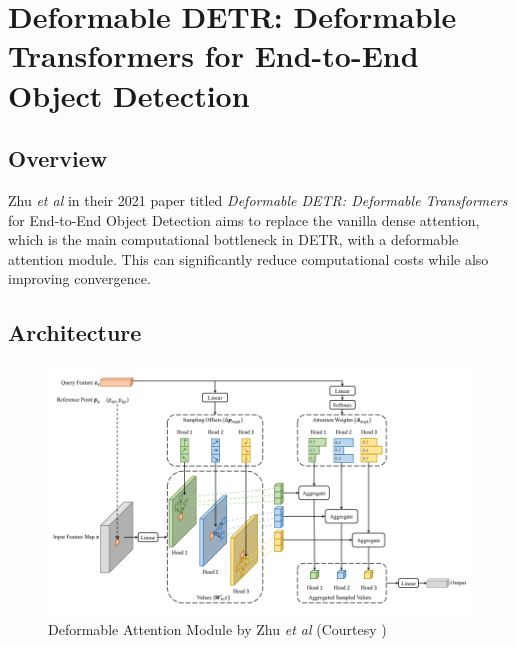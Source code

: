 \section{Deformable DETR: Deformable Transformers for End-to-End Object Detection}

\label{appendix:deformable-detr-paper}

\subsection{Overview}

\par Zhu \textit{et al} in their 2021 paper titled \textit{Deformable DETR: Deformable Transformers} for End-to-End Object Detection aims to replace the vanilla dense attention, which is the main computational bottleneck in DETR, with a deformable attention module. This can significantly reduce computational costs while also improving convergence.
\par

\subsection{Architecture}
\begin{figure}[h]
	\centering
	\includegraphics[width=\linewidth]{assets/img/deformable-attention-module.png}
	\caption{Deformable Attention Module by Zhu
		\textit{et al} (Courtesy \cite{deformable-detr})}
\end{figure}


